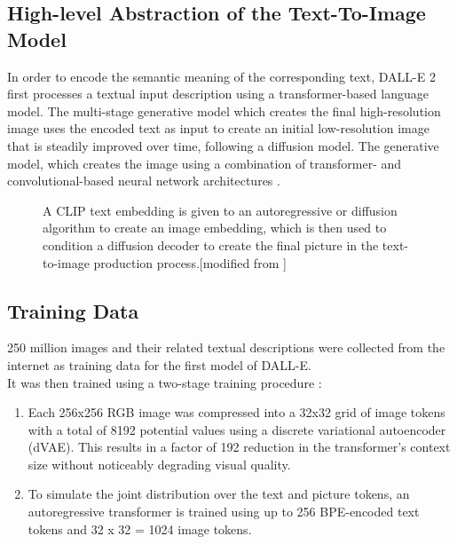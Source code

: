 \documentclass[10pt,twocolumn,twoside]{osajnl}
\begin{document}
\subsection{High-level Abstraction of the Text-To-Image Model}
In order to encode the semantic meaning of the corresponding text, DALL-E 2 first processes a textual input description using a transformer-based language model. The multi-stage generative model which creates the final high-resolution image uses the encoded text as input to create an initial low-resolution image that is steadily improved over time, following a diffusion model. The generative model, which creates the image using a combination of transformer- and convolutional-based neural network architectures \cite{T2IReview}. 

\begin{figure} [h]
	\centering
	\caption{A CLIP text embedding is given to an autoregressive or diffusion algorithm to create an image embedding, which is then used to condition a diffusion decoder to create the final picture in the text-to-image production process.[modified from \cite{CLIP}]}
\end{figure}

\subsection{Training Data}
250 million images and their related textual descriptions were collected from the internet as training data for the first model of DALL-E.\\
It was then trained using a two-stage training procedure \cite{zeroShot}:
\begin{enumerate}
	\item Each 256x256 RGB image was compressed into a 32x32 grid of image tokens with a total of 8192 potential values using a discrete variational autoencoder (dVAE). This results in a factor of 192 reduction in the transformer's context size without noticeably degrading visual quality.
	\item To simulate the joint distribution over the text and picture tokens, an autoregressive transformer is trained using up to 256 BPE-encoded text tokens and 32 x 32 = 1024 image tokens.
\end{enumerate}
\end{document}
